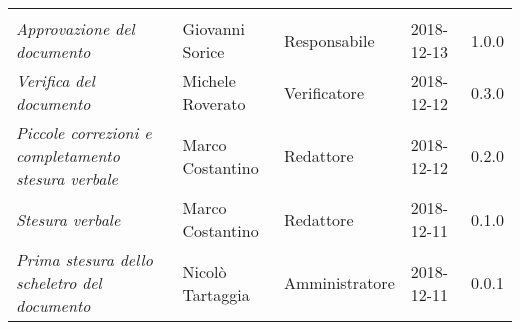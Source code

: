 \newpage 
\section*{}
\begin{table}[H]
	\centering
	\begin{tabular}{p{4cm}|C{3cm}|C{3cm}|R{2.5cm}|R{2cm}}
		
		 & & & & \\
		
		
		\emph{Approvazione del documento} & Giovanni Sorice & Responsabile & 2018-12-13 & 1.0.0 \\
		\hline
		
		\emph{Verifica del documento} & Michele Roverato & Verificatore & 2018-12-12 & 0.3.0 \\
		\hline

		\emph{Piccole correzioni e completamento stesura verbale} & Marco Costantino & Redattore& 2018-12-12 & 0.2.0 \\
		\hline

		\emph{Stesura verbale} & Marco Costantino & Redattore & 2018-12-11 & 0.1.0 \\
		\hline
		
		\emph{Prima stesura dello scheletro del documento} & Nicolò Tartaggia & Amministratore & 2018-12-11 & 0.0.1 \\
		
	\end{tabular}
	
\end{table}


\clearpage